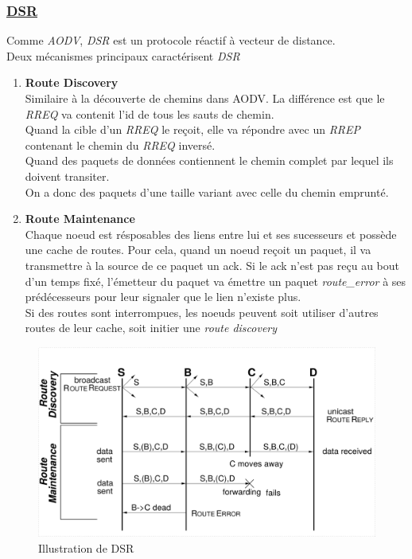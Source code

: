 \documentclass[a4paper, 12pt]{report}
\begin{document}
    \subsubsection{\underline{DSR}}%
        Comme \textit{AODV}, \textit{DSR} est un protocole réactif à vecteur de distance.\\
        Deux mécanismes principaux caractérisent \textit{DSR}\\
        \begin{enumerate}
            \item \textbf{Route Discovery}\\
                Similaire à la découverte de chemins dans AODV. La différence est que le \textit{RREQ} va contenit l'id de tous les sauts de chemin.\\
                Quand la cible d'un \textit{RREQ} le reçoit, elle va répondre avec un \textit{RREP} contenant le chemin du \textit{RREQ} inversé.\\
                Quand des paquets de données contiennent le chemin complet par lequel ils doivent transiter.\\
                On a donc des paquets d'une taille variant avec celle du chemin emprunté.
            \item \textbf{Route Maintenance}\\
                Chaque noeud est résposables des liens entre lui et ses sucesseurs et possède une cache de routes.
                Pour cela, quand un noeud reçoit un paquet, il va transmettre à la source de ce paquet
                un ack. Si le ack n'est pas reçu au bout d'un temps fixé, l'émetteur du paquet va émettre
                un paquet \textit{route\_error} à ses prédécesseurs pour leur signaler que le lien n'existe plus.\\
                Si des routes sont interrompues, les noeuds peuvent soit utiliser d'autres routes de leur cache, soit initier une \textit{route discovery}

        \end{enumerate}
        \begin{figure}[H]
            \centering
            \includegraphics[scale=0.12]{images/ack_dsr.png}
            \caption{Illustration de DSR \cite{dsr_for_adHoc_network}}
            \label{dsr_image}
        \end{figure}
\end{document}
